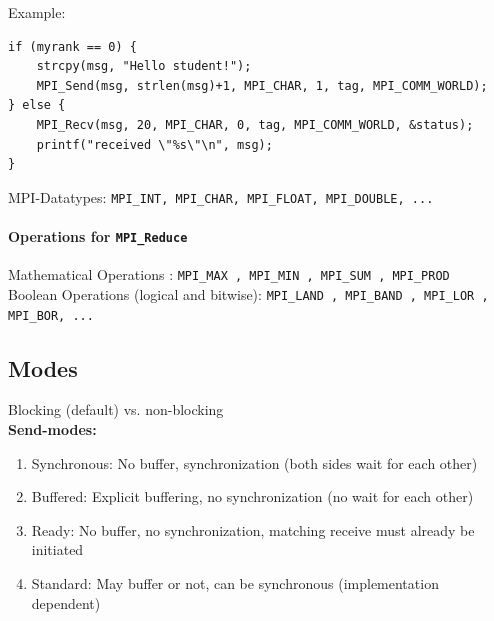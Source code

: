 Example:
\begin{verbatim}
if (myrank == 0) {
    strcpy(msg, "Hello student!");
    MPI_Send(msg, strlen(msg)+1, MPI_CHAR, 1, tag, MPI_COMM_WORLD);
} else {
    MPI_Recv(msg, 20, MPI_CHAR, 0, tag, MPI_COMM_WORLD, &status); 
    printf("received \"%s\"\n", msg);
}
\end{verbatim}
MPI-Datatypes: \texttt{MPI\_INT, MPI\_CHAR, MPI\_FLOAT,  MPI\_DOUBLE, ...}\\

\paragraph{Operations for \texttt{MPI\_Reduce}}
Mathematical Operations : \texttt{MPI\_MAX , MPI\_MIN , MPI\_SUM , MPI\_PROD} \\
Boolean Operations (logical and bitwise): \texttt{MPI\_LAND , MPI\_BAND , MPI\_LOR , MPI\_BOR, ...}\\

\subsection{Modes}

Blocking (default) vs. non-blocking\\

\textbf{Send-modes:}
\begin{enumerate}
	\item Synchronous: No buffer, synchronization (both sides wait for each other)
	\item Buffered:	Explicit buffering, no synchronization (no wait for each other)
	\item Ready: No buffer, no synchronization, matching receive must already be initiated
	\item Standard: May buffer or not, can be synchronous (implementation dependent)
\end{enumerate}




